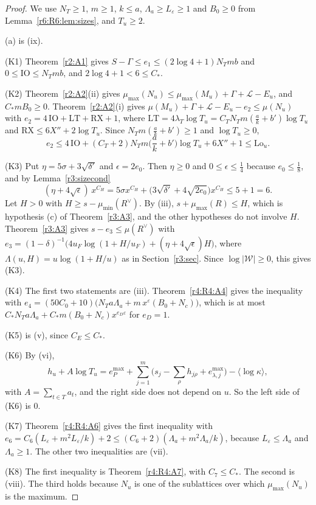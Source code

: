 \begin{proof}
We use $N_T\ge1$, $m\ge1$, $k\le a$, $\Lambda_a\ge L_\varepsilon\ge1$ and $B_0\ge0$ from Lemma~\ref{r6:R6:lem:sizes}, and $T_u\ge2$.

(a) is (ix).

(K1) Theorem~\ref{r2:A1} gives $S-\Gamma\le e_1\le(2\log4+1)N_Tmb$ and $0\le\mathrm{IO}\le N_Tmb$, and $2\log4+1<6\le C_\ast$.

(K2) Theorem~\ref{r2:A2}(ii) gives $\mu_{\max}(N_u)\le\mu_{\max}(M_u)+\Gamma+\mathcal L-E_u$, and $C_\ast mB_0\ge0$. Theorem~\ref{r2:A2}(i) gives $\mu(M_u)+\Gamma+\mathcal L-E_u-e_2\le\mu(N_u)$ with $e_2=4\,\mathrm{IO}+\mathrm{LT}+\mathrm{RX}+1$, where $\mathrm{LT}=4\lambda_T\log T_u=C_TN_Tm(\frac ak+b')\log T_u$ and $\mathrm{RX}\le6X''+2\log T_u$. Since $N_Tm(\frac ak+b')\ge1$ and $\log T_u\ge0$,
\[
e_2\le4\,\mathrm{IO}+(C_T+2)N_Tm\Big(\frac ak+b'\Big)\log T_u+6X''+1\le\mathrm{Lo}_u .
\]

(K3) Put $\eta=5\sigma+3\sqrt{\delta'}$ and $\epsilon=2e_0$. Then $\eta\ge0$ and $0\le\epsilon\le\frac14$ because $e_0\le\frac18$, and by Lemma~\ref{r3:sizecond}
\[
(\eta+4\sqrt\epsilon)\,x^{C_H}=5\sigma x^{C_H}+\big(3\sqrt{\delta'}+4\sqrt{2e_0}\big)x^{C_H}\le5+1=6 .
\]
Let $H>0$ with $H\ge s-\mu_{\min}(R^\vee)$. By (iii), $s+\mu_{\max}(R)\le H$, which is hypothesis (c) of Theorem~\ref{r3:A3}, and the other hypotheses do not involve $H$. Theorem~\ref{r3:A3} gives $s-e_3\le\mu(R^\vee)$ with $e_3=(1-\delta)^{-1}\big(4u_F\log(1+H/u_F)+(\eta+4\sqrt\epsilon)H\big)$, where $\Lambda(u,H)=u\log(1+H/u)$ as in Section~\ref{r3:sec}. Since $\log\lvert\mathcal W\rvert\ge0$, this gives (K3).

(K4) The first two statements are (iii). Theorem~\ref{r4:R4:A4} gives the inequality with $e_4=(50C_0+10)\big(N_Ta\Lambda_a+m\,x^\varepsilon(B_0+N_c)\big)$, which is at most $C_\ast N_Ta\Lambda_a+C_\ast m(B_0+N_c)x^{e_D\varepsilon}$ for $e_D=1$.

(K5) is (v), since $C_E\le C_\ast$.

(K6) By (vi),
\[
h_u+A\log T_u=e^{\max}_P+\sum_{j=1}^m\Big(s_j-\sum_\rho h_{j\rho}+e^{\max}_{\lambda,j}\Big)-\langle\log\kappa\rangle,
\]
with $A=\sum_{t\in T}a_t$, and the right side does not depend on $u$. So the left side of (K6) is $0$.

(K7) Theorem~\ref{r4:R4:A6} gives the first inequality with $e_6=C_6(L_\varepsilon+m^2L_\varepsilon/k)+2\le(C_6+2)(\Lambda_a+m^2\Lambda_a/k)$, because $L_\varepsilon\le\Lambda_a$ and $\Lambda_a\ge1$. The other two inequalities are (vii).

(K8) The first inequality is Theorem~\ref{r4:R4:A7}, with $C_7\le C_\ast$. The second is (viii). The third holds because $N_u$ is one of the sublattices over which $\mu_{\max}(N_u)$ is the maximum.
\end{proof}

